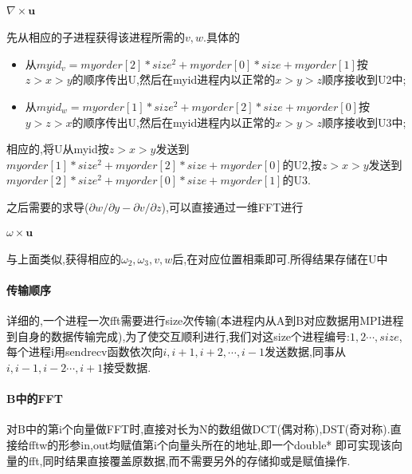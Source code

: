 \documentclass[UTF8]{ctexart}
\begin{document}
\paragraph{$\nabla\times\mathbf{u}$}
先从相应的子进程获得该进程所需的$v,w$.具体的
\begin{itemize}
  \item 从$myid_v=myorder[2]*size^2+myorder[0]*size+myorder[1]$按$z> x> y$的顺序传出U,然后在myid进程内以正常的$x> y> z$顺序接收到U2中;
  \item 从$myid_w=myorder[1]*size^2+myorder[2]*size+myorder[0]$按$y>z>x$的顺序传出U,然后在myid进程内以正常的$x>y>z$顺序接收到U3中;
\end{itemize}
相应的,将U从myid按$z> x> y$发送到$myorder[1]*size^2+myorder[2]*size+myorder[0]$的U2,按$z>x>y$发送到$myorder[2]*size^2+myorder[0]*size+myorder[1]$的U3.

之后需要的求导($\partial w/\partial y - \partial v/\partial z$),可以直接通过一维FFT进行

\paragraph{$\omega\times\mathbf{u}$}
与上面类似,获得相应的$\omega_2,\omega_3,v,w$后,在对应位置相乘即可.所得结果存储在U中

\paragraph{传输顺序}
详细的,一个进程一次fft需要进行size次传输(本进程内从A到B对应数据用MPI进程到自身的数据传输完成),为了使交互顺利进行,我们对这size个进程编号:$1,2\cdots,size$,每个进程i用sendrecv函数依次向$i,i+1,i+2,\cdots,i-1$发送数据,同事从$i,i-1,i-2\cdots,i+1$接受数据.
\paragraph{B中的FFT}
对B中的第i个向量做FFT时,直接对长为N的数组做DCT(偶对称),DST(奇对称).直接给fftw的形参in,out均赋值第i个向量头所在的地址,即一个double* 即可实现该向量的fft,同时结果直接覆盖原数据,而不需要另外的存储抑或是赋值操作.
\end{document}
